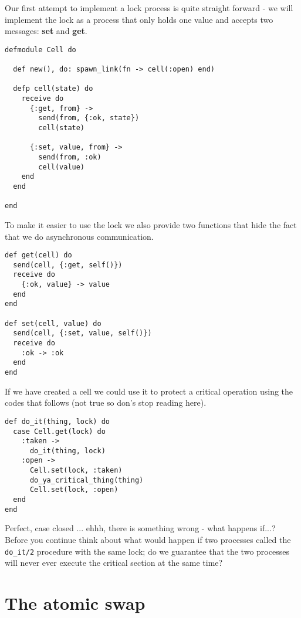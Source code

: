 \documentclass[a4paper,11pt]{article}
\begin{document}
Our first attempt to implement a lock process is quite straight forward
- we will implement the lock as a process that only holds one value
and accepts two messages: {\bf set} and {\bf get}.

\begin{verbatim}
defmodule Cell do
  
  def new(), do: spawn_link(fn -> cell(:open) end)

  defp cell(state) do
    receive do
      {:get, from} ->
        send(from, {:ok, state})
        cell(state)

      {:set, value, from} ->
        send(from, :ok)
        cell(value)
    end
  end

end
\end{verbatim}

To make it easier to use the lock we also provide two functions that
hide the fact that we do asynchronous communication.

\begin{verbatim}
def get(cell) do
  send(cell, {:get, self()})
  receive do
    {:ok, value} -> value
  end
end

def set(cell, value) do
  send(cell, {:set, value, self()})
  receive do
    :ok -> :ok
  end
end
\end{verbatim}

If we have created a cell we could use it to protect a critical
operation using the codes that follows (not true so don's stop
reading here).

\pagebreak

\begin{verbatim}
def do_it(thing, lock) do
  case Cell.get(lock) do
    :taken ->
      do_it(thing, lock)
    :open ->
      Cell.set(lock, :taken)
      do_ya_critical_thing(thing)
      Cell.set(lock, :open)
  end
end
\end{verbatim}

Perfect, case closed ... ehhh, there is something wrong - what happens
if...? Before you continue think about what would happen if two
processes called the {\tt do\_it/2} procedure with the same lock; do we
guarantee that the two processes will never ever execute the critical
section at the same time?



\section{The atomic swap}
\end{document}
